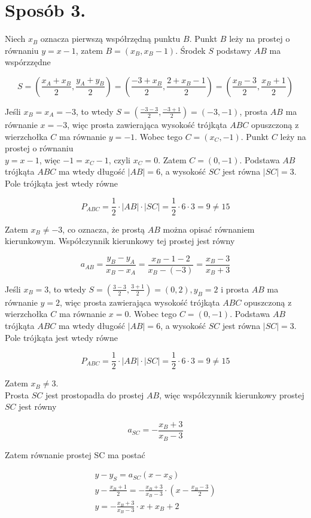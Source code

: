 \documentclass[10pt]{article}
\begin{document}
\section*{Sposób 3.}
Niech $x_{B}$ oznacza pierwszą współrzędną punktu $B$. Punkt $B$ leży na prostej o równaniu $y=x-1$, zatem $B=\left(x_{B}, x_{B}-1\right)$. Środek $S$ podstawy $A B$ ma wspórzzędne

$$
S=\left(\frac{x_{A}+x_{B}}{2}, \frac{y_{A}+y_{B}}{2}\right)=\left(\frac{-3+x_{B}}{2}, \frac{2+x_{B}-1}{2}\right)=\left(\frac{x_{B}-3}{2}, \frac{x_{B}+1}{2}\right)
$$

Jeśli $x_{B}=x_{A}=-3$, to wtedy $S=\left(\frac{-3-3}{2}, \frac{-3+1}{2}\right)=(-3,-1)$, prosta $A B$ ma równanie $x=-3$, więc prosta zawierająca wysokość trójkąta $A B C$ opuszczoną z wierzchołka $C$ ma równanie $y=-1$. Wobec tego $C=\left(x_{C},-1\right)$. Punkt $C$ leży na prostej o równaniu\\
$y=x-1$, więc $-1=x_{C}-1$, czyli $x_{C}=0$. Zatem $C=(0,-1)$. Podstawa $A B$ trójkąta $A B C$ ma wtedy długość $|A B|=6$, a wysokość $S C$ jest równa $|S C|=3$. Pole trójkąta jest wtedy równe

$$
P_{A B C}=\frac{1}{2} \cdot|A B| \cdot|S C|=\frac{1}{2} \cdot 6 \cdot 3=9 \neq 15
$$

Zatem $x_{B} \neq-3$, co oznacza, że prostą $A B$ można opisać równaniem kierunkowym. Współczynnik kierunkowy tej prostej jest równy

$$
a_{A B}=\frac{y_{B}-y_{A}}{x_{B}-x_{A}}=\frac{x_{B}-1-2}{x_{B}-(-3)}=\frac{x_{B}-3}{x_{B}+3}
$$

Jeśli $x_{B}=3$, to wtedy $S=\left(\frac{3-3}{2}, \frac{3+1}{2}\right)=(0,2), y_{B}=2$ i prosta $A B$ ma równanie $y=2$, więc prosta zawierająca wysokość trójkąta $A B C$ opuszczoną z wierzchołka $C$ ma równanie $x=0$. Wobec tego $C=(0,-1)$. Podstawa $A B$ trójkąta $A B C$ ma wtedy długość $|A B|=6$, a wysokość $S C$ jest równa $|S C|=3$. Pole trójkąta jest wtedy równe

$$
P_{A B C}=\frac{1}{2} \cdot|A B| \cdot|S C|=\frac{1}{2} \cdot 6 \cdot 3=9 \neq 15
$$

Zatem $x_{B} \neq 3$.\\
Prosta $S C$ jest prostopadła do prostej $A B$, więc współczynnik kierunkowy prostej $S C$ jest równy

$$
a_{S C}=-\frac{x_{B}+3}{x_{B}-3}
$$

Zatem równanie prostej SC ma postać

$$
\begin{gathered}
y-y_{S}=a_{S C}\left(x-x_{S}\right) \\
y-\frac{x_{B}+1}{2}=-\frac{x_{B}+3}{x_{B}-3} \cdot\left(x-\frac{x_{B}-3}{2}\right) \\
y=-\frac{x_{B}+3}{x_{B}-3} \cdot x+x_{B}+2
\end{gathered}
$$
\end{document}
